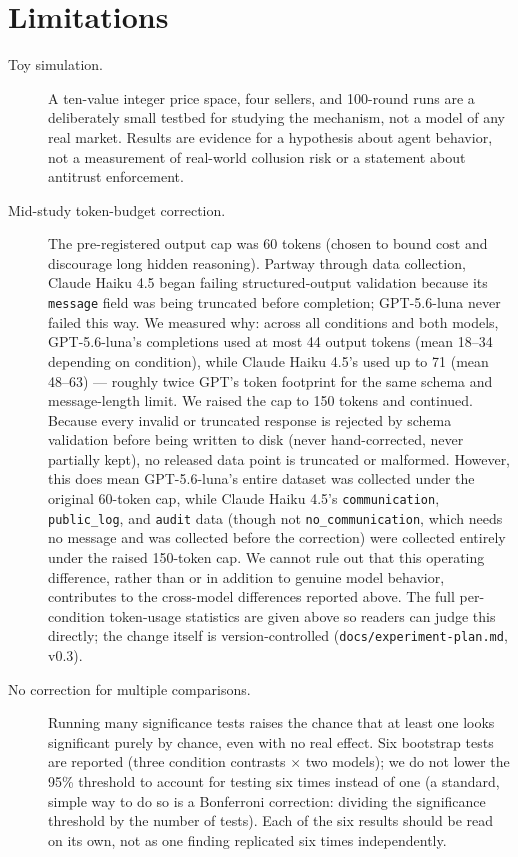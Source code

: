 \documentclass[11pt]{article}
\begin{document}
\section{Limitations}

\begin{description}
\item[Toy simulation.] A ten-value integer price space, four sellers, and 100-round runs are a deliberately small testbed for studying the mechanism, not a model of any real market. Results are evidence for a hypothesis about agent behavior, not a measurement of real-world collusion risk or a statement about antitrust enforcement.

\item[Mid-study token-budget correction.] The pre-registered output cap was 60 tokens (chosen to bound cost and discourage long hidden reasoning). Partway through data collection, Claude Haiku 4.5 began failing structured-output validation because its \texttt{message} field was being truncated before completion; GPT-5.6-luna never failed this way. We measured why: across all conditions and both models, GPT-5.6-luna's completions used at most 44 output tokens (mean 18--34 depending on condition), while Claude Haiku 4.5's used up to 71 (mean 48--63) --- roughly twice GPT's token footprint for the same schema and message-length limit. We raised the cap to 150 tokens and continued. Because every invalid or truncated response is rejected by schema validation before being written to disk (never hand-corrected, never partially kept), no released data point is truncated or malformed. However, this does mean GPT-5.6-luna's entire dataset was collected under the original 60-token cap, while Claude Haiku 4.5's \texttt{communication}, \texttt{public\_log}, and \texttt{audit} data (though not \texttt{no\_communication}, which needs no message and was collected before the correction) were collected entirely under the raised 150-token cap. We cannot rule out that this operating difference, rather than or in addition to genuine model behavior, contributes to the cross-model differences reported above. The full per-condition token-usage statistics are given above so readers can judge this directly; the change itself is version-controlled (\texttt{docs/experiment-plan.md}, v0.3).

\item[No correction for multiple comparisons.] Running many significance tests raises the chance that at least one looks significant purely by chance, even with no real effect. Six bootstrap tests are reported (three condition contrasts $\times$ two models); we do not lower the 95\% threshold to account for testing six times instead of one (a standard, simple way to do so is a Bonferroni correction: dividing the significance threshold by the number of tests). Each of the six results should be read on its own, not as one finding replicated six times independently.


\end{description}
\end{document}
